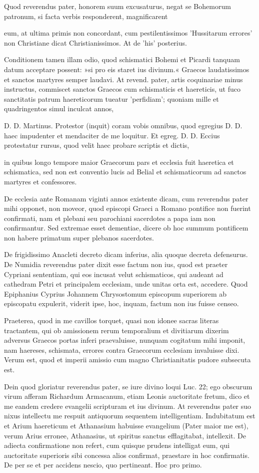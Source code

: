 Quod reverendus pater, honorem suum excusaturus, negat se Bohemorum patronum, si facta verbis responderent, magnificarent

eum, at ultima primis non concordant, cum pestilentissimos 'Hussitarum errores' non Christiane dicat Christianissimos. At de 'his' posterius.

Conditionem tamen illam odio, quod schismatici Bohemi et Picardi tanquam datum acceptare possent: »si pro eis staret ius divinum.« Graecos laudatissimos et sanctos martyres semper laudavi. At revend. pater, artis coquinariae minus instructus, commiscet sanctos Graecos cum schismaticis et haereticis, ut fuco sanctitatis patrum haereticorum tueatur 'perfidiam'; quoniam mille et quadringentos simul inculcat annos,

D. D. Martinus. Protestor (inquit) coram vobis omnibus, quod egregius D. D. haec impudenter et mendaciter de me loquitur. Et egreg. D. D. Eccius protestatur rursus, quod velit haec probare scriptis et dictis,

in \marginpar{\small[281]} quibus longo tempore maior Graecorum pars et ecclesia fuit haeretica et schismatica, sed non est conventio lucis ad Belial et schismaticorum ad sanctos martyres et confessores.

De ecclesia ante Romanam viginti annos existente dicam, cum reverendus pater mihi opponet, non moveor, quod episcopi Graeci a Romano pontifice non fuerint confirmati, nam et plebani seu parochiani sacerdotes a papa iam non confirmantur. Sed extremae esset dementiae, dicere ob hoc summum pontificem non habere primatum super plebanos sacerdotes.

De frigidissimo Anacleti decreto dicam inferius, alia quoque decreta defensurus. De Numidia reverendus pater dixit esse factum non ius, quod est praeter Cypriani sententiam, qui eos incusat velut schismaticos, qui audeant ad cathedram Petri et principalem ecclesiam, unde unitas orta est, accedere. Quod Epiphanius Cyprius Johannem Chrysostomum episcopum superiorem ab episcopatu expulerit, viderit ipse, hoc, inquam, factum non ius fuisse censeo.

Praeterea, quod in me cavillos torquet, quasi non idonee sacras literas tractantem, qui ob amissionem rerum temporalium et divitiarum dixerim adversus Graecos portas inferi praevaluisse, nunquam cogitatum mihi imponit, nam haereses, schismata, errores contra Graecorum ecclesiam invaluisse dixi. Verum est, quod et imperii amissio cum magno Christianitatis pudore subsecuta est.

Dein quod gloriatur reverendus pater, se iure divino loqui Luc. 22; ego obscurum virum afferam Richardum Armacanum, etiam Leonis auctoritate fretum, dico et me eandem credere evangelii scripturam et ius divinum. At reverendus pater suo nixus intellectu me respuit antiquorum sequentem intelligentiam. Indubitatum est et Arium haereticum et Athanasium habuisse evangelium (Pater maior me est), verum Arius erronee, Athanasius, ut spiritus sanctus efflagitabat, intellexit. De adiecta confirmatione non refert, cum quisque prudens intelligat eum, qui auctoritate superioris sibi concessa alios confirmat, praestare in hoc confirmatis. De per se et per accidens nescio, quo pertineant. Hoc pro primo.

